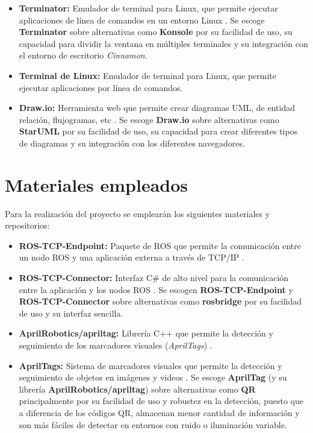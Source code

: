 \begin{itemize}
    Se escoge \textbf{Rviz} sobre alternativas como \textbf{Foxglove Studio} por su integración nativa con ROS y su capacidad para visualizar datos en tiempo real.
    \item \textbf{Terminator:} Emulador de terminal para Linux, que permite ejecutar aplicaciones de línea de comandos en un entorno Linux \parencite{gnometerminatorOverview}.
    Se escoge \textbf{Terminator} sobre alternativas como \textbf{Konsole} por su facilidad de uso, su capacidad para dividir la ventana en múltiples terminales y su integración con el entorno de escritorio \textit{Cinnamon}.
    \item \textbf{Terminal de Linux:} Emulador de terminal para Linux, que permite ejecutar aplicaciones por línea de comandos.
    \item \textbf{Draw.io:} Herramienta web que permite crear diagramas UML, de entidad relación, flujogramas, etc \parencite{diagramsFlowchartMaker}.
    Se escoge \textbf{Draw.io} sobre alternativas como \textbf{StarUML} por su facilidad de uso, su capacidad para crear diferentes tipos de diagramas y su integración con los diferentes navegadores.
\end{itemize}

\section{Materiales empleados}
Para la realización del proyecto se emplearán los siguientes materiales y repositorios:
\begin{itemize}
    \item \textbf{ROS-TCP-Endpoint:} Paquete de ROS que permite la comunicación entre un nodo ROS y una aplicación externa a través de TCP/IP \parencite{githubGitHubUnityTechnologiesROSTCPEndpoint}.
    \item \textbf{ROS-TCP-Connector:} Interfaz C\# de alto nivel para la comunicación entre la aplicación y los nodos ROS \parencite{githubGitHubUnityTechnologiesROSTCPConnector}.
    Se escogen \textbf{ROS-TCP-Endpoint} y \textbf{ROS-TCP-Connector} sobre alternativas como \textbf{rosbridge} por su facilidad de uso y su interfaz sencilla.
    \item \textbf{AprilRobotics/apriltag:} Librería C++ que permite la detección y seguimiento de los marcadores visuales (\textit{AprilTags}) \parencite{githubGitHubAprilRoboticsapriltag}.
    \item \textbf{AprilTags:} Sistema de marcadores visuales que permite la detección y seguimiento de objetos en imágenes y videos \parencite{umichAprilTag}.
    Se escoge \textbf{AprilTag} (y su librería \textbf{AprilRobotics/apriltag}) sobre alternativas como \textbf{QR} principalmente por su facilidad de uso y robustez en la detección, puesto que 
    a diferencia de los códigos QR, almacenan menor cantidad de información y son más fáciles de detectar en entornos con ruido o iluminación variable.
\end{itemize}

